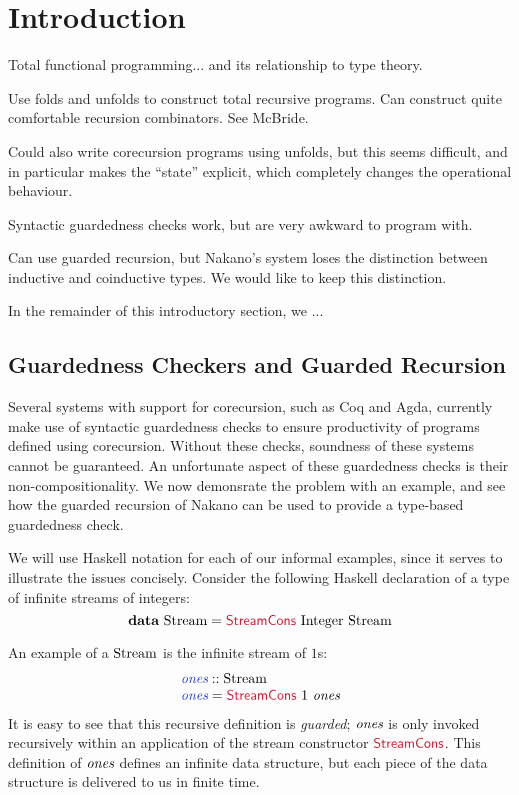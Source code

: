 \section{Introduction}\label{sec:introduction}

Total functional programming... and its relationship to type theory.

Use folds and unfolds to construct total recursive programs. Can
construct quite comfortable recursion combinators. See McBride.

Could also write corecursion programs using unfolds, but this seems
difficult, and in particular makes the ``state'' explicit, which
completely changes the operational behaviour.

Syntactic guardedness checks work, but are very awkward to program
with.

Can use guarded recursion, but Nakano's system loses the distinction
between inductive and coinductive types. We would like to keep this
distinction.

In the remainder of this introductory section, we ...

\subsection{Guardedness Checkers and Guarded Recursion}

Several systems with support for corecursion, such as Coq and Agda,
currently make use of syntactic guardedness checks to ensure
productivity of programs defined using corecursion. Without these
checks, soundness of these systems cannot be guaranteed. An
unfortunate aspect of these guardedness checks is their
non-compositionality. We now demonsrate the problem with an example,
and see how the guarded recursion of Nakano can be used to provide a
type-based guardedness check.

We will use Haskell notation for each of our informal examples, since
it serves to illustrate the issues concisely. Consider the following
Haskell declaration of a type of infinite streams of integers:
\begin{displaymath}
  \kw{data}\ \tyname{Stream} = \cons{StreamCons}\ \tyname{Integer}\ \tyname{Stream}
\end{displaymath}

An example of a $\textrm{Stream}$ is the infinite stream of $1$s:
\begin{displaymath}
  \begin{array}{l}
    \defn{ones} :: \tyname{Stream} \\
    \defn{ones} = \cons{StreamCons}\ 1\ \ident{ones}
  \end{array}
\end{displaymath}
It is easy to see that this recursive definition is \emph{guarded};
$\textit{ones}$ is only invoked recursively within an application of
the stream constructor $\cons{StreamCons}$. This definition of
$\textit{ones}$ defines an infinite data structure, but each piece of
the data structure is delivered to us in finite time.

